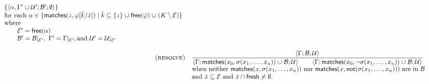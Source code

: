 \begin{figure*}
$$\begin{array}{rlrlrrr}
\begin{array}{l}
                                             { \{ \sequent{ \alpha, \Gamma' \union \Universals'; \Basic' ;  \emptyset } \}
                                             } \\
                                  \text{for each $\alpha \in \{ \matches{z}{\phi[\bar k/\bar x]} \mid \bar k \subset \{z\} \union \free{\bar \phi} \union (K \setminus \Elements) \}$} \\
                                  \text{where} \\
                                  \text{\qquad $\Elements'   = \free{\alpha}$} \\
                                  \text{\qquad $\Basic' = \Basic|_{\Elements'}$},
                                  \text{       $\Gamma' = \Gamma|_{\Elements'}$},
                                  \text{and    $\Universals' = \Universals|_{\Elements'}$}
                                  \end{array}
\\\\
\prule{resolve}                 & \multicolumn{3}{l}{
                                  \satrulebin{\sequent{ \Gamma; \Basic; \Universals}}
                                            {\sequent{ \Gamma; \matches{x_0}{\sigma(x_1,\ldots,x_n)}      \union \Basic; \Universals}}
                                            {\sequent{ \Gamma; \matches{x_0}{\lnot\sigma(x_1,\ldots,x_n)} \union \Basic; \Universals}} } \\
               & \multicolumn{3}{l}{\text{when neither $\matches{x}{{\sigma(x_1,\ldots,x_n)}}$ nor $\matches{x}{\fnot{\sigma(x_1,\ldots,x_n)}}$ are in $\Basic$}} \\
               & \multicolumn{3}{l}{\text{and  $\bar x \subset \Elements$ and $\bar x \intersection \mathsf{fresh} \neq \emptyset$.}} \\
\\
\end{array}$$
\end{figure*}
